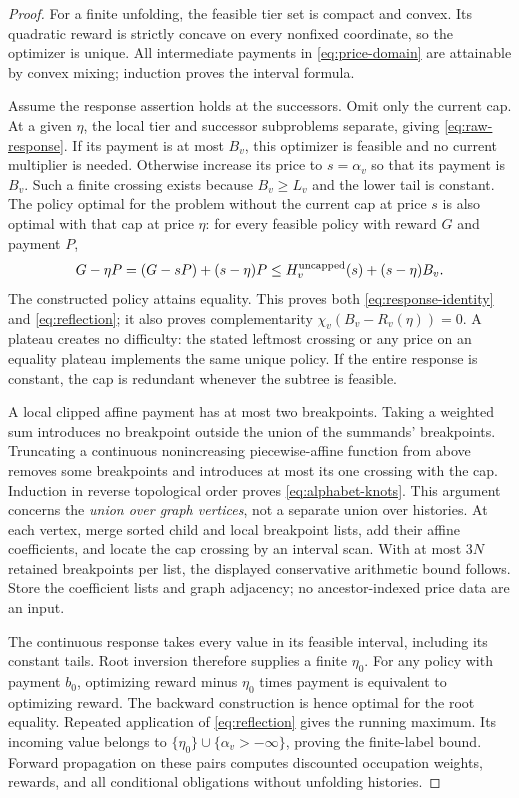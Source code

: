\begin{proof}
For a finite unfolding, the feasible tier set is compact and convex. Its quadratic reward is strictly concave on every nonfixed coordinate, so the optimizer is unique. All intermediate payments in \eqref{eq:price-domain} are attainable by convex mixing; induction proves the interval formula.

Assume the response assertion holds at the successors. Omit only the current cap. At a given $\eta$, the local tier and successor subproblems separate, giving \eqref{eq:raw-response}. If its payment is at most $B_v$, this optimizer is feasible and no current multiplier is needed. Otherwise increase its price to $s=\alpha_v$ so that its payment is $B_v$. Such a finite crossing exists because $B_v\geq L_v$ and the lower tail is constant. The policy optimal for the problem without the current cap at price $s$ is also optimal with that cap at price $\eta$: for every feasible policy with reward $G$ and payment $P$,
\[
 G-\eta P=(G-sP)+(s-\eta)P
 \leq H_v^{\rm uncapped}(s)+(s-\eta)B_v.
\]
The constructed policy attains equality. This proves both \eqref{eq:response-identity} and \eqref{eq:reflection}; it also proves complementarity $\chi_v(B_v-R_v(\eta))=0$. A plateau creates no difficulty: the stated leftmost crossing or any price on an equality plateau implements the same unique policy. If the entire response is constant, the cap is redundant whenever the subtree is feasible.

A local clipped affine payment has at most two breakpoints. Taking a weighted sum introduces no breakpoint outside the union of the summands' breakpoints. Truncating a continuous nonincreasing piecewise-affine function from above removes some breakpoints and introduces at most its one crossing with the cap. Induction in reverse topological order proves \eqref{eq:alphabet-knots}. This argument concerns the \emph{union over graph vertices}, not a separate union over histories. At each vertex, merge sorted child and local breakpoint lists, add their affine coefficients, and locate the cap crossing by an interval scan. With at most $3N$ retained breakpoints per list, the displayed conservative arithmetic bound follows. Store the coefficient lists and graph adjacency; no ancestor-indexed price data are an input.

The continuous response takes every value in its feasible interval, including its constant tails. Root inversion therefore supplies a finite $\eta_0$. For any policy with payment $b_0$, optimizing reward minus $\eta_0$ times payment is equivalent to optimizing reward. The backward construction is hence optimal for the root equality. Repeated application of \eqref{eq:reflection} gives the running maximum. Its incoming value belongs to $\{\eta_0\}\cup\{\alpha_v> -\infty\}$, proving the finite-label bound. Forward propagation on these pairs computes discounted occupation weights, rewards, and all conditional obligations without unfolding histories.
\end{proof}

